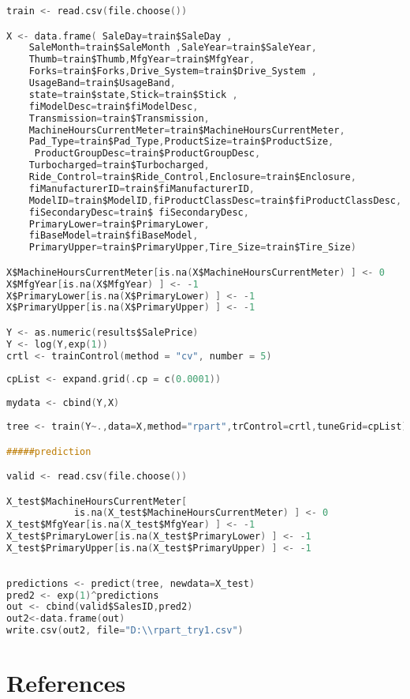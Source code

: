 \documentclass[paper=a4, fontsize=11pt]{scrartcl}	%
\numberwithin{equation}{section}		%
\numberwithin{figure}{section}			%
\numberwithin{table}{section}				%
\begin{document}
\begin{lstlisting}[language=C,frame=single]
train <- read.csv(file.choose())

X <- data.frame( SaleDay=train$SaleDay ,
	SaleMonth=train$SaleMonth ,SaleYear=train$SaleYear,
	Thumb=train$Thumb,MfgYear=train$MfgYear,
	Forks=train$Forks,Drive_System=train$Drive_System , 
	UsageBand=train$UsageBand,
	state=train$state,Stick=train$Stick ,
	fiModelDesc=train$fiModelDesc,
	Transmission=train$Transmission,
	MachineHoursCurrentMeter=train$MachineHoursCurrentMeter,
	Pad_Type=train$Pad_Type,ProductSize=train$ProductSize,
	 ProductGroupDesc=train$ProductGroupDesc,
	Turbocharged=train$Turbocharged,
	Ride_Control=train$Ride_Control,Enclosure=train$Enclosure, 
	fiManufacturerID=train$fiManufacturerID, 
	ModelID=train$ModelID,fiProductClassDesc=train$fiProductClassDesc,
	fiSecondaryDesc=train$ fiSecondaryDesc,
	PrimaryLower=train$PrimaryLower,
	fiBaseModel=train$fiBaseModel,
	PrimaryUpper=train$PrimaryUpper,Tire_Size=train$Tire_Size)

X$MachineHoursCurrentMeter[is.na(X$MachineHoursCurrentMeter) ] <- 0
X$MfgYear[is.na(X$MfgYear) ] <- -1
X$PrimaryLower[is.na(X$PrimaryLower) ] <- -1
X$PrimaryUpper[is.na(X$PrimaryUpper) ] <- -1

Y <- as.numeric(results$SalePrice)
Y <- log(Y,exp(1))
crtl <- trainControl(method = "cv", number = 5)
 
cpList <- expand.grid(.cp = c(0.0001))
 
mydata <- cbind(Y,X)
 
tree <- train(Y~.,data=X,method="rpart",trControl=crtl,tuneGrid=cpList)

#####prediction

valid <- read.csv(file.choose())

X_test$MachineHoursCurrentMeter[
			is.na(X_test$MachineHoursCurrentMeter) ] <- 0
X_test$MfgYear[is.na(X_test$MfgYear) ] <- -1
X_test$PrimaryLower[is.na(X_test$PrimaryLower) ] <- -1
X_test$PrimaryUpper[is.na(X_test$PrimaryUpper) ] <- -1
 
 
predictions <- predict(tree, newdata=X_test)
pred2 <- exp(1)^predictions
out <- cbind(valid$SalesID,pred2)
out2<-data.frame(out)
write.csv(out2, file="D:\\rpart_try1.csv")


\end{lstlisting}

\section{References}
\end{document}
